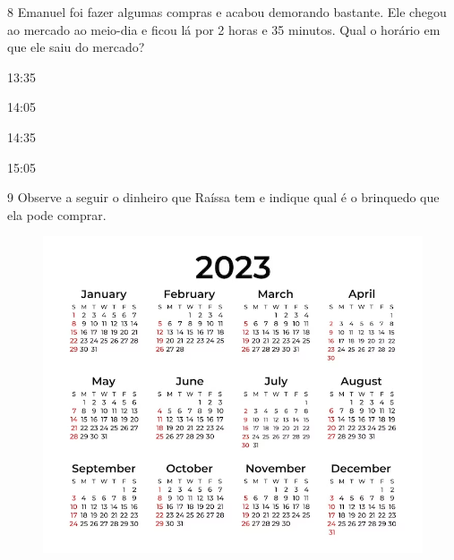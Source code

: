 \num{8} Emanuel foi fazer algumas compras e acabou demorando bastante. Ele chegou ao mercado ao meio-dia e ficou lá por 2 horas e 35 minutos. Qual
o horário em que ele saiu do mercado?

\begin{minipage}{.5\textwidth}
\begin{escolha}
\item 13:35

\item 14:05

\item 14:35

\item 15:05
\end{escolha}
\end{minipage}

\num{9} Observe a seguir o dinheiro que Raíssa tem e indique qual é o brinquedo que ela pode comprar.

\begin{figure}[htpb!]
\includegraphics[width=\textwidth]{./media/image156.png}
\end{figure}

